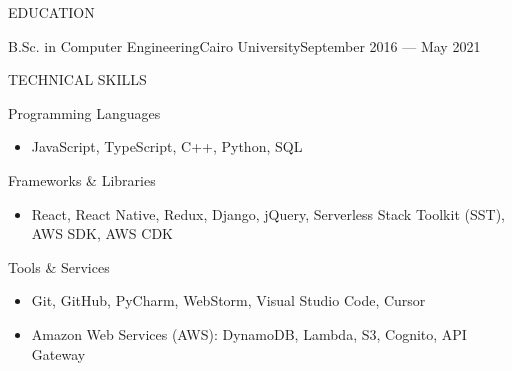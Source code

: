 \documentclass[]{mcdowellcv}
\begin{document}
	\begin{cvsection}{EDUCATION}
		\begin{cvsubsection}{B.Sc. in Computer Engineering}{Cairo University}{September 2016 — May 2021}\end{cvsubsection}
	\end{cvsection}
	\vspace*{-12pt}
	
	\begin{cvsection}{TECHNICAL SKILLS}
		\begin{cvsubsection}{Programming Languages}{}{}
			\begin{itemize}
				\item JavaScript, TypeScript, C++, Python, SQL
			\end{itemize}
		\end{cvsubsection}
		\begin{cvsubsection}{Frameworks \& Libraries}{}{}
			\begin{itemize}
				\item React, React Native, Redux, Django, jQuery, Serverless Stack Toolkit (SST), AWS SDK, AWS CDK
			\end{itemize}
		\end{cvsubsection}
		\begin{cvsubsection}{Tools \& Services}{}{}
			\begin{itemize}
				\item Git, GitHub, PyCharm, WebStorm, Visual Studio Code, Cursor
				\item Amazon Web Services (AWS): DynamoDB, Lambda, S3, Cognito, API Gateway
			\end{itemize}
		\end{cvsubsection}
	\end{cvsection}
	
\end{document}
